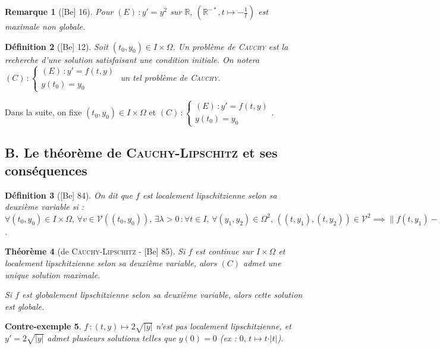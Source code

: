 \documentclass[10pt, a4paper, parskip=full, twoside, twocolumn]{report}
\newtheorem{definition}{Définition}
\newtheorem{theorem}[definition]{Théorème}
\newtheorem{cexample}[definition]{Contre-exemple}
\newtheorem{remark}[definition]{Remarque}
\newcommand{\IR}{\mathbb{R}}
\begin{document}
\begin{remark}[\textnormal{[Be] 16}]
	Pour $(E) \,\colon y' = y^2$ sur $\IR$, $(\IR^{-*}, t\mapsto -\frac{1}{t})$ est maximale non globale.
\end{remark}

\begin{definition}[\textnormal{[Be] 12}]
	Soit $(t_0, y_0)\in I\times \Omega$. Un \emph{problème de \textsc{Cauchy}} est la recherche d'une solution satisfaisant une \emph{condition initiale}.
	On notera $(C)\,\colon \begin{cases}
		(E)\,\colon y'=f(t,y) \\
		y(t_0) = y_0
	\end{cases}$ un tel problème de \textsc{Cauchy}.
\end{definition}

\textcolor{paragraphtext}{Dans la suite, on fixe $(t_0,y_0)\in I\times \Omega$ et $(C)\,\colon \begin{cases}
	(E)\,\colon y' = f(t,y)\\ y(t_0)=y_0
\end{cases}$.}

\subsection*{B. Le théorème de \textsc{Cauchy-Lipschitz} et ses conséquences}
\begin{definition}[\textnormal{[Be] 84}]
	On dit que $f$ est \emph{localement lipschitzienne selon sa deuxième variable} si :
	$\forall(t_0,y_0)\in I\times \Omega,\, \forall v\in\mathcal{V}\left((t_0,y_0)\right),\, \exists \lambda > 0\,\colon \forall t\in I,\, \forall (y_1,y_2)\in\Omega^2,\, \left((t,y_1),(t,y_2)\right)\in\mathcal{V}^2\implies \|f(t,y_1) - f(t,y_2)\| \geq \lambda\|y_1-y_2\|$.
\end{definition}

\begin{theorem}[de \textsc{Cauchy-Lipschitz} - \textnormal{[Be] 85}]
	Si $f$ est continue sur $I\times \Omega$ et localement lipschitzienne selon sa deuxième variable, alors $(C)$ admet une unique solution maximale.

	Si $f$ est globalement lipschitzienne selon sa deuxième variable, alors cette solution est globale.
\end{theorem}

\begin{cexample}
	$f\,\colon (t,y)\mapsto 2\sqrt{\vert y\vert}$ n'est pas localement lipschitzienne, et $y'=2\sqrt{\vert y\vert}$ admet plusieurs solutions telles que $y(0)=0$ (ex : $0,\, t\mapsto t\cdot \vert t\vert$).
\end{cexample}
\end{document}
